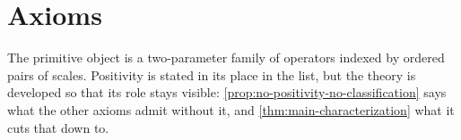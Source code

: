%
%
%
%

\chapter{Axioms}
\label{ch:axioms}

The primitive object is a two-parameter family of operators indexed by ordered pairs of
scales. Positivity is stated in its place in the list, but the theory is developed so that
its role stays visible: \ref{prop:no-positivity-no-classification} says what the other axioms
admit without it, and \ref{thm:main-characterization} what it cuts that down to.

